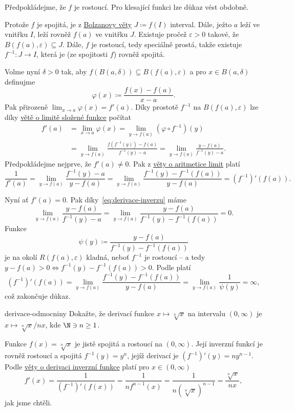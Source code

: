\begin{thmproof}
 Předpokládejme, že $f$ je rostoucí. Pro klesající funkci lze důkaz vést
 obdobně.

 Protože $f$ je spojitá, je z \hyperref[thm:bolzanova]{Bolzanovy věty} $J
 \coloneqq f(I)$ interval. Dále, ježto $a$ leží ve vnitřku $I$, leží rovněž
 $f(a)$ ve vnitřku $J$. Existuje pročež $\varepsilon>0$ takové, že
 $B(f(a),\varepsilon) \subseteq J$. Dále, $f$ je rostoucí, tedy speciálně
 prostá, takže existuje $f^{-1}:J \to I$, která je (ze spojitosti $f$) rovněž
 spojitá.

 Volme nyní $\delta>0$ tak, aby $f(B(a,\delta)) \subseteq B(f(a),\varepsilon)$ a
 pro $x \in B(a,\delta)$ definujme
 \[
  \varphi(x) \coloneqq \frac{f(x) - f(a)}{x - a}.
 \]
 Pak přirozeně $\lim_{x \to a} \varphi(x) = f'(a)$. Díky prostotě $f^{-1}$ na
 $B(f(a),\varepsilon)$ lze díky \hyperref[thm:limita-slozene-funkce]{větě o
 limitě složené funkce} počítat
 \begin{equation}
  \label{eq:derivace-inverzu}
  \tag{$\heartsuit$}
  \begin{split}
   f'(a) &= \lim_{x \to a} \varphi(x) = \lim_{y \to f(a)} (\varphi \circ
   f^{-1})(y)\\
         &= \lim_{y \to f(a)} \frac{f(f^{-1}(y)) - f(a)}{f^{-1}(y) - a} = \lim_{y
         \to f(a)} \frac{y - f(a)}{f^{-1}(y) - a}.
  \end{split}
 \end{equation}
 Předpokládejme nejprve, že $f'(a) \neq 0$. Pak z
 \hyperref[thm:aritmetika-limit-funkci]{věty o aritmetice limit} platí
 \[
  \frac{1}{f'(a)} = \lim_{y \to f(a)} \frac{f^{-1}(y) - a}{y - f(a)} = \lim_{y
  \to f(a)} \frac{f^{-1}(y) - f^{-1}(f(a))}{y - f(a)} = (f^{-1})'(f(a)).
 \]
 
 Nyní ať $f'(a) = 0$. Pak díky~\eqref{eq:derivace-inverzu} máme
 \[
  \lim_{y \to f(a)} \frac{y-f(a)}{f^{-1}(y) - a} = \lim_{y \to f(a)}
  \frac{y-f(a)}{f^{-1}(y) - f^{-1}(f(a))} = 0.
 \]
 Funkce
 \[
  \psi(y) \coloneqq \frac{y-f(a)}{f^{-1}(y) - f^{-1}(f(a))}
 \]
 je na okolí $R(f(a),\varepsilon)$ kladná, neboť $f^{-1}$ je rostoucí -- a tedy
 $y - f(a) > 0 \Leftrightarrow f^{-1}(y) - f^{-1}(f(a)) > 0$. Podle
  platí
 \[
  (f^{-1})'(f(a)) = \lim_{y \to f(a)} \frac{f^{-1}(y) - f^{-1}(f(a))}{y - f(a)}
  = \lim_{y \to f(a)} \frac{1}{\psi(y)} = \infty,
 \]
 což zakončuje důkaz.
\end{thmproof}

\begin{problem}{}{derivace-odmocniny}
 Dokažte, že derivací funkce $x \mapsto \sqrt[n]{x}$ na intervalu $(0,\infty)$
 je $x \mapsto \sqrt[n]{x} / nx$, kde $\N \ni n \geq 1$.
\end{problem}
\begin{probsol}
 Funkce $f(x) = \sqrt[n]{x}$ je jistě spojitá a rostoucí na $(0,\infty)$. Její
 inverzní funkcí je rovněž rostoucí a spojitá $f^{-1}(y) = y^{n}$, jejíž
 derivací je $(f^{-1})'(y) = ny^{n-1}$. Podle
 \hyperref[thm:derivace-inverzni-funkce]{věty o derivaci inverzní funkce} platí
 pro $x \in (0,\infty)$
 \[
  f'(x) = \frac{1}{(f^{-1})'(f(x))} = \frac{1}{n f^{n-1}(x)} = \frac{1}{n
  (\sqrt[n]{x})^{n-1}} = \frac{\sqrt[n]{x}}{nx},
 \]
 jak jsme chtěli.
\end{probsol}

